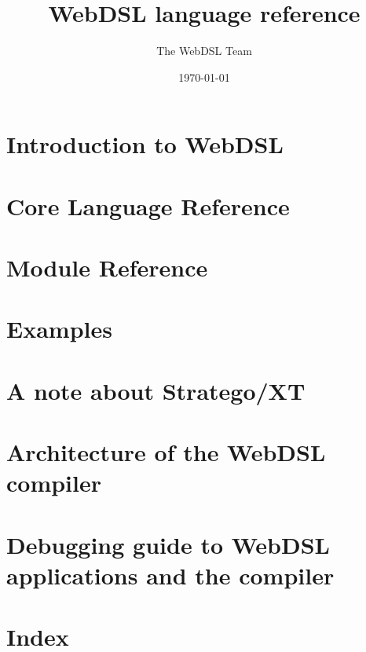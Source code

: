 \documentclass[10pt, b5paper,twoside,openright]{book}
\title{WebDSL language reference}
\author{The WebDSL Team}
\date{\today}
\begin{document}
\frontmatter
\maketitle
\tableofcontents 

\mainmatter
\part{Introduction to WebDSL}


\part{Core Language Reference}


\part{Module Reference}



\backmatter
\appendix
\part{Examples}

\part{A note about Stratego/XT}


\part{Architecture of the WebDSL compiler}

\part{Debugging guide to WebDSL applications and the compiler}

\part{Index}
\lstlistoflistings
\printindex
\end{document}
